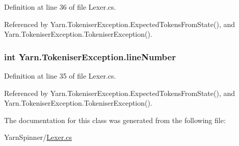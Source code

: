 Definition at line 36 of file Lexer.\-cs.



Referenced by Yarn.\-Tokeniser\-Exception.\-Expected\-Tokens\-From\-State(), and Yarn.\-Tokeniser\-Exception.\-Tokeniser\-Exception().

\hypertarget{a00164_a54b936d7b4f26f88a07a66c5fc1d1ad1}{
\subsubsection[{line\-Number}]{\setlength{\rightskip}{0pt plus 5cm}int Yarn.\-Tokeniser\-Exception.\-line\-Number}}\label{a00164_a54b936d7b4f26f88a07a66c5fc1d1ad1}


Definition at line 35 of file Lexer.\-cs.



Referenced by Yarn.\-Tokeniser\-Exception.\-Expected\-Tokens\-From\-State(), and Yarn.\-Tokeniser\-Exception.\-Tokeniser\-Exception().



The documentation for this class was generated from the following file\-:\begin{DoxyCompactItemize}
\item 
Yarn\-Spinner/\hyperlink{a00292}{Lexer.\-cs}\end{DoxyCompactItemize}
